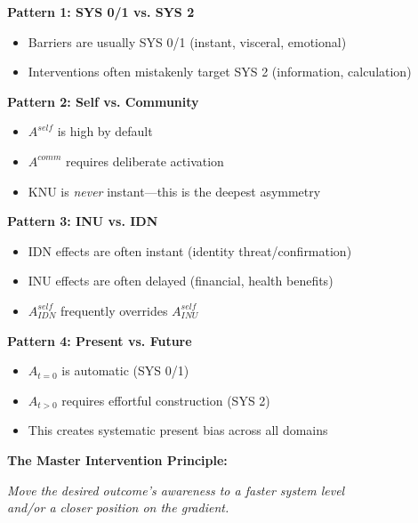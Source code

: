 \begin{tcolorbox}[colback=gray!5!white, colframe=gray!75!black, title=Cross-Domain Awareness Patterns]

\textbf{Pattern 1: SYS 0/1 vs. SYS 2}
\begin{itemize}
\item Barriers are usually SYS 0/1 (instant, visceral, emotional)
\item Interventions often mistakenly target SYS 2 (information, calculation)
\end{itemize}

\textbf{Pattern 2: Self vs. Community}
\begin{itemize}
\item $A^{self}$ is high by default
\item $A^{comm}$ requires deliberate activation
\item KNU is \emph{never} instant---this is the deepest asymmetry
\end{itemize}

\textbf{Pattern 3: INU vs. IDN}
\begin{itemize}
\item IDN effects are often instant (identity threat/confirmation)
\item INU effects are often delayed (financial, health benefits)
\item $A^{self}_{IDN}$ frequently overrides $A^{self}_{INU}$
\end{itemize}

\textbf{Pattern 4: Present vs. Future}
\begin{itemize}
\item $A_{t=0}$ is automatic (SYS 0/1)
\item $A_{t>0}$ requires effortful construction (SYS 2)
\item This creates systematic present bias across all domains
\end{itemize}

\textbf{The Master Intervention Principle:}
\begin{center}
\emph{Move the desired outcome's awareness to a faster system level\\
and/or a closer position on the gradient.}
\end{center}

\end{tcolorbox}

